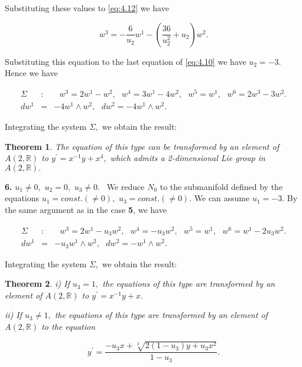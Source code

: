 \documentclass{amsproc}
\newtheorem{theorem}{Theorem}[section]
\theoremstyle{remark}
\numberwithin{equation}{section}
\begin{document}
Substituting these values to \eqref{eq:4.12} we have

\begin{equation*}
w^{3}=-\frac{6}{u_{2}}w^{1}-(\frac{36}{u_{2}^{2}}+u_{2})w^{2}.
\end{equation*}

Substituting this equation to the last equation of \eqref{eq:4.10} we have $u_{2}=-3.$ Hence we have

\begin{eqnarray*}
\Sigma &:&\text{ }w^{3}=2w^{1}-w^{2},\text{ \ }w^{4}=3w^{1}-4w^{2},\text{ \ }w^{5}=w^{1},\text{ \ }w^{6}=2w^{3}-3w^{2}. \\
dw^{1} &=&-4w^{1}\wedge w^{2},\text{ \ }dw^{2}=-4w^{1}\wedge w^{2}.
\end{eqnarray*}

Integrating the system $\Sigma ,$ we obtain the result:

\begin{theorem}
The equation of this type can be transformed by an element of $A(2,\mathbb{R}
)$ to $y^{\prime }=x^{-1}y+x^{4},$ which admits a 2-dimensional Lie group in 
$A(2,\mathbb{R}
).$
\end{theorem}

\textbf{6. }$u_{1}\neq 0,$ $u_{2}=0,$ $u_{3}\neq 0.$ \ We reduce $N_{0}$ to
the submanifold defined by the equations $u_{1}=const.(\neq 0),$ $u_{3}=const.(\neq 0).$ We can assume $u_{1}=-3.$ By the same argument as in
the case \textbf{5}, we have

\begin{eqnarray*}
\Sigma &:&\text{ }w^{3}=2w^{1}-u_{3}w^{2},\text{ }w^{4}=-u_{3}w^{2},\text{ }w^{5}=w^{1},\text{ }w^{6}=w^{1}-2u_{3}w^{2}. \\
dw^{1} &=&-u_{3}w^{1}\wedge w^{2},\text{ \ }dw^{2}=-w^{1}\wedge w^{2}.
\end{eqnarray*}

Integrating the system $\Sigma ,$ we obtain the result:

\begin{theorem}
i) If $u_{3}=1,$ the equations of this type are transformed by an element of 
$A(2,\mathbb{R}
)$ to $y^{\prime }=x^{-1}y+x.$

ii) If $u_{3}\neq 1,$ the equations of this type are transformed by an
element of $A(2,\mathbb{R}
)$ to the equation

\begin{equation*}
y^{\prime }=\frac{-u_{3}x+\sqrt[2]{2(1-u_{3})y+u_{3}x^{2}}}{1-u_{3}}.
\end{equation*}
\end{theorem}
\end{document}
